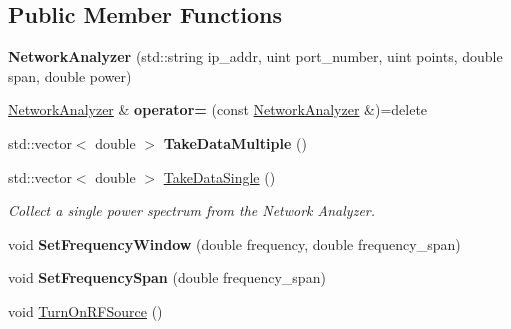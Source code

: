 \subsection*{Public Member Functions}
\begin{DoxyCompactItemize}
\item 
\hypertarget{class_network_analyzer_a1d8a2de50a5079e392e912e3bc25cbbb}{{\bfseries Network\+Analyzer} (std\+::string ip\+\_\+addr, uint port\+\_\+number, uint points, double span, double power)}\label{class_network_analyzer_a1d8a2de50a5079e392e912e3bc25cbbb}

\item 
\hypertarget{class_network_analyzer_a2785c012d28fb621e7218a9e471716e3}{\hyperlink{class_network_analyzer}{Network\+Analyzer} \& {\bfseries operator=} (const \hyperlink{class_network_analyzer}{Network\+Analyzer} \&)=delete}\label{class_network_analyzer_a2785c012d28fb621e7218a9e471716e3}

\item 
\hypertarget{class_network_analyzer_a667cf86a80639bb57c67061b7c9df210}{std\+::vector$<$ double $>$ {\bfseries Take\+Data\+Multiple} ()}\label{class_network_analyzer_a667cf86a80639bb57c67061b7c9df210}

\item 
std\+::vector$<$ double $>$ \hyperlink{class_network_analyzer_aa7ae9c649f4d7a5828e2d24ad8dee65d}{Take\+Data\+Single} ()
\begin{DoxyCompactList}\small\item\em Collect a single power spectrum from the Network Analyzer. \end{DoxyCompactList}\item 
\hypertarget{class_network_analyzer_a65864fe6142eadfd8e3e976e592e4bf0}{void {\bfseries Set\+Frequency\+Window} (double frequency, double frequency\+\_\+span)}\label{class_network_analyzer_a65864fe6142eadfd8e3e976e592e4bf0}

\item 
\hypertarget{class_network_analyzer_a5d986f4eb0ed10030ba02ef43b65ac30}{void {\bfseries Set\+Frequency\+Span} (double frequency\+\_\+span)}\label{class_network_analyzer_a5d986f4eb0ed10030ba02ef43b65ac30}

\item 
\hypertarget{class_network_analyzer_a6d4e76a043fd30788167c4c0e187ed00}{void \hyperlink{class_network_analyzer_a6d4e76a043fd30788167c4c0e187ed00}{Turn\+On\+R\+F\+Source} ()}\label{class_network_analyzer_a6d4e76a043fd30788167c4c0e187ed00}


\end{DoxyCompactItemize}
